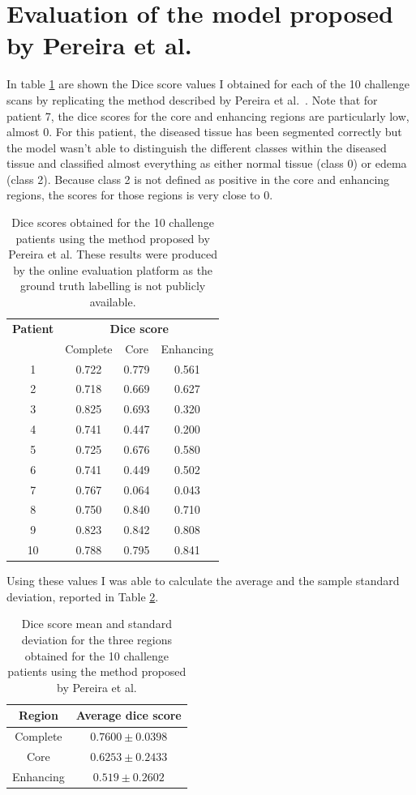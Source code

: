 \documentclass[12pt,a4paper,twoside,openright]{report}
\begin{document}
\section{Evaluation of the model proposed by Pereira et al.}
In table \ref{table:pereira_dice_results} are shown the Dice score values I obtained for each of the 10 challenge scans by replicating the method described by Pereira et al.\ \cite{pereira}. Note that for patient 7, the dice scores for the core and enhancing regions are particularly low, almost 0. For this patient, the diseased tissue has been segmented correctly but the model wasn't able to distinguish the different classes within the diseased tissue and classified almost everything as either normal tissue (class 0) or edema (class 2). Because class 2 is not defined as positive in the core and enhancing regions, the scores for those regions is very close to 0.
\begin{table}[h]
\centering	
\label{table:pereira_dice_results}
\begin{tabular}{ c | c c c} 
\textbf{Patient} & \multicolumn{3}{c}{\textbf{Dice score}} \\
 & Complete & Core & Enhancing \\
 \hline
1 &	0.722 & 0.779 & 0.561\\
2 & 0.718 & 0.669 & 0.627 \\
3 & 0.825 & 0.693 & 0.320 \\
4 & 0.741 & 0.447 & 0.200 \\
5 & 0.725 & 0.676 & 0.580 \\
6 & 0.741 & 0.449 & 0.502 \\
7 & 0.767 & 0.064 & 0.043 \\
8 & 0.750 & 0.840 & 0.710 \\
9 & 0.823 & 0.842 & 0.808 \\
10 & 0.788 & 0.795 & 0.841 \\
\end{tabular}
\caption{Dice scores obtained for the 10 challenge patients using the method proposed by Pereira et al. These results were produced by the online evaluation platform as the ground truth labelling is not publicly available.}
\end{table}

Using these values I was able to calculate the average and the sample standard deviation, reported in Table \ref{table:pereira_dice_average}.
\begin{table}[h]
\centering	
\label{table:pereira_dice_average}
\begin{tabular}{ c | c } 
\textbf{Region} & \textbf{Average dice score}\\
 \hline
Complete &	$0.7600 \pm 0.0398$ \\
Core & 		$0.6253 \pm 0.2433$ \\
Enhancing & $0.519  \pm 0.2602$ \\
\end{tabular}
\caption{Dice score mean and standard deviation for the three regions obtained for the 10 challenge patients using the method proposed by Pereira et al.}
\end{table}
\end{document}
